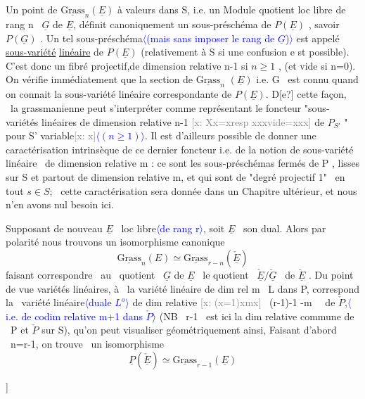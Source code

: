 \documentclass[11pt]{article}
\newcommand{\scanpage}[1]{\par\bigskip\noindent{\small\sffamily[scan #1]}\par}
\newcommand{\mspage}[1]{{\small\sffamily[p.\,#1]}}
\newcommand{\hand}[1]{\textcolor{blue}{#1}}
\newcommand{\inserted}[2][]{\textcolor{blue}{$\langle$#2$\rangle$}}
\newcommand{\xout}[1]{\textcolor{gray}{[\textsf{x:} #1]}}
\newcommand{\uline}[1]{\underline{#1}}
\newcommand{\unsure}[1]{[#1?]}
\begin{document}
Un point de $\underline{\mathrm{Grass}}_n(\underline{E})$ à valeurs dans S, i.e. un Module quotient
loc libre de rang n \ $\underline{G}$ de $\underline{E}$, définit canoniquement un sous-préschéma
de $P(\underline{E})$ , savoir $P(\underline{G})$ . Un tel sous-préschéma\inserted{(mais sans imposer le rang de $\underline{G}$)} est appelé \uline{sous-variété}
\uline{linéaire} de $P(\underline{E})$ (relativement à S si une confusion e st possible).
C'est donc un fibré projectif,de dimension relative n-1 si $n\geqslant 1$ ,
(et vide si n=0). On vérifie immédiatement que la section de $\underline{\mathrm{Grass}}_n$
$(\underline{E})$ i.e. G \ est connu quand on connait la sous-variété linéaire
correspondante de $P(\underline{E})$. D\unsure{e} cette façon, \ la grassmanienne peut
s'interpréter comme représentant le foncteur "sous-variétés linéaires
de dimension relative n-1 \xout{Xx=xresp xxxvide=xxx} de $P_{S'}$ " pour S'
variable\xout{x}\inserted[typed]{$(n\geqslant 1)$}. Il est d'ailleurs possible de donner une caractérisation
intrinsèque de ce dernier foncteur i.e. de la notion de sous-variété
linéaire \ de dimension relative m : ce sont les sous-préschémas fermés
de P , lisses sur S et partout de dimension relative m, et qui sont
de "degré projectif 1" \ en tout $s\in S$; \ cette caractérisation sera
donnée dans un Chapitre ultérieur, et nous n'en avons nul besoin ici.

Supposant de nouveau $\underline{E}$ \ loc libre\inserted[typed]{de rang r}, soit $\underline{E}$ \ son dual. Alors
par polarité nous trouvons un isomorphisme canonique
\[ \underline{\mathrm{Grass}}_n(E) \simeq \underline{\mathrm{Grass}}_{r-n}(\check{\underline{E}}) \]
faisant correspondre \ au \ quotient \ $\underline{G}$ de $\underline{E}$ \ le quotient \ $\check{\underline{E}}/\check{\underline{G}}$ \ de $\check{\underline{E}}$ .
Du point de vue variétés linéaires, à \ la variété linéaire de dim rel
m \ L dans P, correspond la \ variété linéaire\inserted[typed]{duale $L^{o}$} de dim relative
\xout{(x=1)xmx} \ (r-1)-1 -m \ \ de $\check{P}$,\inserted{i.e. de codim relative m+1 dans $\check{P}$} (NB \ r-1 \ est ici la dim relative
commune de \ P et $\check{P}$ sur S), qu'on peut visualiser géométriquement ainsi,
Faisant d'abord \ n=r-1, on trouve \ un isomorphisme
\[ \underline{P}(\check{\underline{E}}) \simeq \underline{\mathrm{Grass}}_{r-1}(\underline{E}) \]

\mspage{64}

\clearpage
\scanpage{25/65}
\mspage{\unsure{33}} \mspage{\hand{60}}
\end{document}
